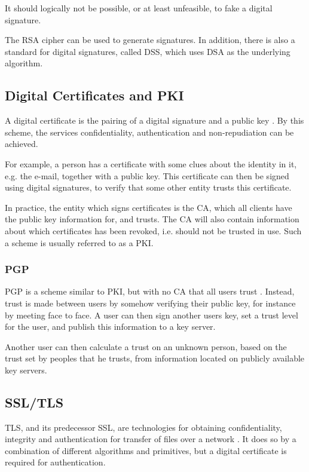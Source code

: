 \documentclass[pdftex,english,10pt,b5paper,twoside]{book}
\begin{document}
It should logically not be possible, or at least unfeasible, to fake a digital
signature.

The \ac{RSA} cipher can be used to generate signatures. In addition, there is also a
standard for digital signatures, called \ac{DSS}, which uses \ac{DSA} as the
underlying algorithm.

\subsection{Digital Certificates and PKI}

A digital certificate is the pairing of a digital signature and a public key
\cite{stallings}. By this scheme, the services confidentiality, authentication
and non-repudiation can be achieved. 

For example, a person has a certificate with some clues about the identity
in it, e.g. the e-mail, together with a public key. This certificate can then
be signed using digital signatures, to verify that some other entity trusts this
certificate.

In practice, the entity which signs certificates is the \ac{CA}, which all
clients have the public key information for, and trusts. The \ac{CA} will also
contain information about which certificates has been revoked, i.e. should not
be trusted in use. Such a scheme is usually referred to as a \ac{PKI}.

\subsubsection{PGP}

\ac{PGP} is a scheme similar to \ac{PKI}, but with no \ac{CA} that all users
trust \cite{stallings}. Instead, trust is made between users by somehow
verifying their public key, for instance by meeting face to face. A user can
then sign another users key, set a trust level for the user, and publish this
information to a key server.

Another user can then calculate a trust on an unknown person, based on the trust
set by peoples that he trusts, from information located on publicly
available key servers.

\subsection{SSL/TLS}

\ac{TLS}, and its predecessor \ac{SSL}, are technologies for obtaining
confidentiality, integrity and authentication for transfer of files over a
network \cite{stallings}. It does so by a combination of different algorithms
and primitives, but a digital certificate is required for authentication.
\end{document}
